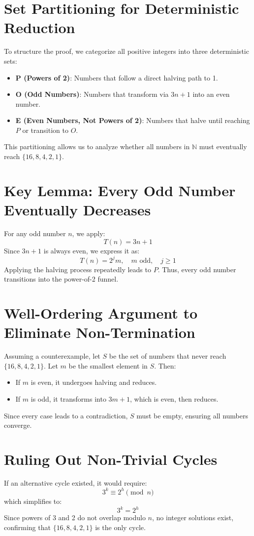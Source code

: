\documentclass[12pt]{article}
\begin{document}
\section{Set Partitioning for Deterministic Reduction}
To structure the proof, we categorize all positive integers into three deterministic sets:
\begin{itemize}
    \item \textbf{P (Powers of 2)}: Numbers that follow a direct halving path to 1.
    \item \textbf{O (Odd Numbers)}: Numbers that transform via $3n + 1$ into an even number.
    \item \textbf{E (Even Numbers, Not Powers of 2)}: Numbers that halve until reaching $P$ or transition to $O$.
\end{itemize}
This partitioning allows us to analyze whether all numbers in $\mathbb{N}$ must eventually reach $\{16, 8, 4, 2, 1\}$.

\section{Key Lemma: Every Odd Number Eventually Decreases}
For any odd number $n$, we apply:
\begin{equation}
    T(n) = 3n + 1
\end{equation}
Since $3n + 1$ is always even, we express it as:
\begin{equation}
    T(n) = 2^j m, \quad m \text{ odd}, \quad j \geq 1
\end{equation}
Applying the halving process repeatedly leads to $P$. Thus, every odd number transitions into the power-of-2 funnel.

\section{Well-Ordering Argument to Eliminate Non-Termination}
Assuming a counterexample, let $S$ be the set of numbers that never reach $\{16, 8, 4, 2, 1\}$. Let $m$ be the smallest element in $S$. Then:
\begin{itemize}
    \item If $m$ is even, it undergoes halving and reduces.
    \item If $m$ is odd, it transforms into $3m + 1$, which is even, then reduces.
\end{itemize}
Since every case leads to a contradiction, $S$ must be empty, ensuring all numbers converge.

\section{Ruling Out Non-Trivial Cycles}
If an alternative cycle existed, it would require:
\begin{equation}
    3^k \equiv 2^h \pmod{n}
\end{equation}
which simplifies to:
\begin{equation}
    3^k = 2^h
\end{equation}
Since powers of 3 and 2 do not overlap modulo $n$, no integer solutions exist, confirming that $\{16, 8, 4, 2, 1\}$ is the only cycle.
\end{document}
